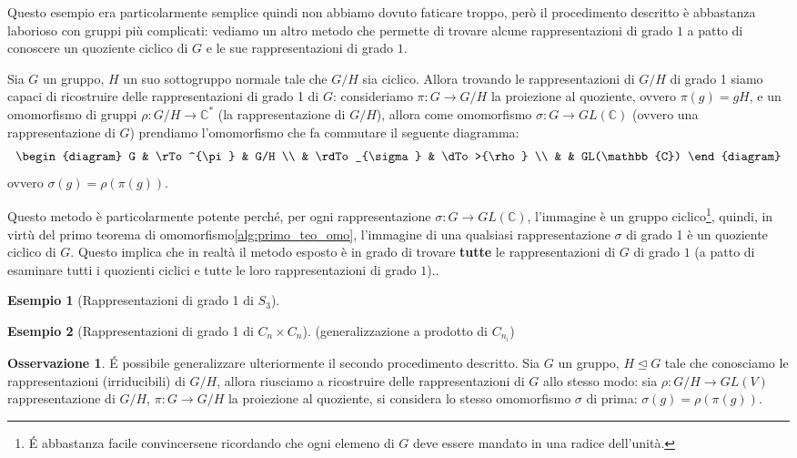 \documentclass[11pt]{article}
\theoremstyle{plain}
\theoremstyle{definition}
\newtheorem{exmp}{Esempio}[section]
\newtheorem*{rem}{Osservazione}
\theoremstyle{remark}
\newcommand{\C}{\mathbb{C}}
\newcommand{\tridiag}[6]{
	  \begin{diagram}
	  #1 & \rTo^{#2}  & #3        \\
	     & \rdTo_{#6} & \dTo>{#4}   \\
	     &          & #5
	  \end{diagram}
}
\begin{document}
Questo esempio era particolarmente semplice quindi non abbiamo dovuto faticare troppo, però il procedimento descritto è abbastanza
laborioso con gruppi più complicati: vediamo un altro metodo che permette di trovare alcune rappresentazioni
di grado $1$ a patto di conoscere un quoziente ciclico di $G$ e le sue rappresentazioni di grado $1$.

Sia $G$ un gruppo, $H$ un suo sottogruppo normale tale che $G/H$ sia ciclico. Allora trovando le rappresentazioni di $G/H$ di grado 1 siamo capaci di ricostruire delle rappresentazioni di grado 1 di $G$: consideriamo $\pi:G\to G/H$ la proiezione al quoziente, ovvero $\pi(g)=gH$, e un omomorfismo di gruppi $\rho:G/H\to \C^*$ (la rappresentazione di $G/H$), allora come omomorfismo $\sigma:G\to GL(\C)$ (ovvero una rappresentazione di $G$) prendiamo l'omomorfismo che fa commutare il seguente diagramma:
\[\tridiag G \pi {G/H} \rho {GL(\C)} \sigma\]
ovvero $\sigma(g)=\rho(\pi(g))$.

Questo metodo è particolarmente potente perché, per ogni rappresentazione $\sigma:G\to GL(\C)$, l'immagine è un gruppo ciclico\footnote{\'E abbastanza facile convincersene ricordando che ogni elemeno di $G$ deve essere mandato in una radice dell'unità.}, quindi, in virtù del primo teorema di omomorfismo\eqref{alg:primo_teo_omo}, l'immagine di una qualsiasi rappresentazione $\sigma$ di grado 1 è un quoziente ciclico di $G$.
Questo implica che in realtà il metodo esposto è in grado di trovare \textbf{tutte} le rappresentazioni di $G$ di grado $1$ (a patto di esaminare
tutti i quozienti ciclici e tutte le loro rappresentazioni di grado $1$)..


\begin{exmp}[Rappresentazioni di grado 1 di $S_3$]

\end{exmp}

\begin{exmp}[Rappresentazioni di grado 1 di $C_n \times C_n$]


(generalizzazione a prodotto di $C_{n_i}$)
\end{exmp}

\begin{rem}
	\'E possibile generalizzare ulteriormente il secondo procedimento descritto. Sia $G$ un gruppo, $H\trianglelefteq G$ tale che conosciamo le rappresentazioni (irriducibili) di $G/H$, allora riusciamo a ricostruire delle rappresentazioni di $G$ allo stesso modo: sia $\rho:G/H\to GL(V)$ rappresentazione di $G/H$, $\pi:G\to G/H$ la proiezione al quoziente, si considera lo stesso omomorfismo $\sigma$ di prima: $\sigma(g) = \rho(\pi(g))$.
\end{rem}
\end{document}

